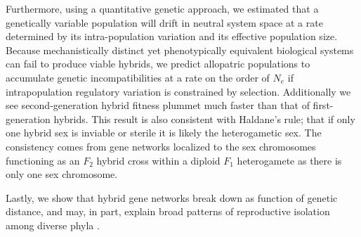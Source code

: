 \documentclass{article}
\newcommand{\plr}[1]{\todo[color=blue!25]{#1}}
\newcommand{\js}[1]{\todo[color=green!25]{#1}}
\newcommand{\plr}[1]{{\color{blue}\it #1}}
\newcommand{\1}{\mathbbm{1}}
\begin{document}
Furthermore, using a quantitative genetic approach, we estimated that a genetically variable population will drift in neutral system space 
at a rate determined by its intra-population variation and its effective population size. 
Because mechanistically distinct yet phenotypically equivalent biological systems can fail to produce viable hybrids, we predict allopatric populations to accumulate genetic incompatibilities 
at a rate on the order of $N_{e}$ if intrapopulation regulatory variation is constrained by selection.
Additionally we see second-generation hybrid fitness plummet much faster than that of first-generation hybrids. 
\plr{refer to Turelli here}
This result is also consistent with Haldane's rule; that if only one hybrid sex is inviable or sterile it is likely the heterogametic sex. 
The consistency comes from gene networks localized to the sex chromosomes functioning as an $F_{2}$ hybrid cross within a diploid $F_{1}$ heterogamete as there is only one sex chromosome.
  
Lastly, we show that hybrid gene networks break down as function of genetic distance, and may, in part, explain broad patterns of reproductive isolation among diverse phyla \citep{roux2016shedding}.

\end{document}
